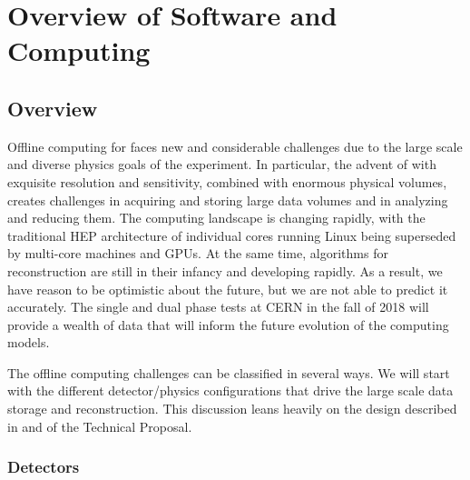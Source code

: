 %
\chapter{Overview of Software and Computing }


\section{Overview}

Offline computing for   faces new and considerable challenges due to the large scale and diverse physics goals of the experiment.  In particular, the advent of   with exquisite resolution and sensitivity, combined with enormous physical volumes, creates challenges in acquiring and storing large data volumes and in analyzing and reducing them.  The computing landscape is changing rapidly, with the traditional HEP architecture of individual cores running Linux being superseded by multi-core machines and GPUs. At the same time, algorithms for  reconstruction are still in their infancy and developing rapidly.  As a result, we have reason to be optimistic about the future, but we are not able to predict it accurately.  The  single and dual phase tests at CERN in the fall of 2018 will provide a wealth of data that will inform the future evolution of  the  computing models.

The   offline computing challenges can be classified in several ways.  We will start with the different detector/physics configurations that drive the large scale data storage and reconstruction. 
This discussion leans heavily on the  design described in \voltitlespfd and \voltitledpfd  of the  Technical Proposal. 

\subsection{Detectors}


